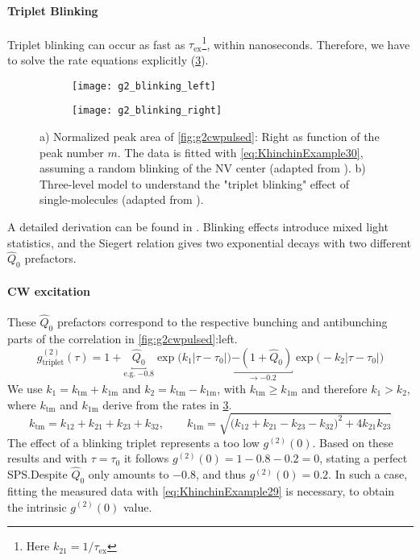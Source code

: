 \paragraph{Triplet Blinking}
Triplet blinking can occur as fast as $\tau_\mathrm{ex}$\footnote{Here $k_\mathrm{21}=1/\tau_\mathrm{ex}$}, within nanoseconds. Therefore, we have to solve the rate equations explicitly (\cref{fig:Blinking_b}). 
\begin{figure}[htp]
	\centering
	\begin{subfigure}{0.49\linewidth}
		\centering
		\texttt{[image: g2\_blinking\_left]}
		\caption{}
		\label{fig:Blinking_a}
	\end{subfigure}
	\hfill
	\begin{subfigure}{0.445\linewidth}
		\centering
		\texttt{[image: g2\_blinking\_right]}
		\caption{}
		\label{fig:Blinking_b}
	\end{subfigure}
	\caption{a) Normalized peak area of \cref{fig:g2cwpulsed}: Right as function of the peak number $m$. The data is fitted with \cref{eq:KhinchinExample30}, assuming a random blinking of the NV center (adapted from \cite{beveratos_room_2002}). b) Three-level model to understand the "triplet blinking" effect of single-molecules (adapted from \cite{tombesi_bunching_2002}).}
\end{figure}
\noindent A detailed derivation can be found in \cite{tombesi_bunching_2002}. Blinking effects introduce mixed light statistics, and the Siegert relation gives two exponential decays with two different $\hat{Q}_0$ prefactors.
\paragraph{CW excitation} These $\hat{Q}_0$ prefactors correspond to the respective bunching and antibunching parts of the correlation in \cref{fig:g2cwpulsed}:left.
\begin{equation}\label{eq:KhinchinExample29}
	g^{(2)}_\mathrm{triplet}(\tau) = 1 + \underbracket{\hat{Q}_0}_\mathrm{e.g.\;\num{-0.8}}\exp\Big(k_1|\tau-\tau_0|\Big)\underbracket{-(1+\hat{Q}_0)}_{\rightarrow \num{-0.2}}\exp\Big(-k_2|\tau-\tau_0|\Big)
\end{equation}
We use $k_1=k_\mathrm{tm}+k_\mathrm{1m}$ and $k_2=k_\mathrm{tm}-k_\mathrm{1m}$, with $k_\mathrm{tm}\geq k_\mathrm{1m}$ and therefore $k_1>k_2$, where $k_\mathrm{tm}$ and $k_\mathrm{1m}$ derive from the rates in \cref{fig:Blinking_b}.
\begin{equation}\label{eq:KhinchinExample210}
	k_\mathrm{tm}=k_\mathrm{12}+k_\mathrm{21}+k_\mathrm{23}+k_\mathrm{32},\qquad k_\mathrm{1m}=\sqrt{\Big(k_\mathrm{12}+k_\mathrm{21}-k_\mathrm{23}-k_\mathrm{32}\Big)^2+4k_\mathrm{21}k_\mathrm{23}}
\end{equation}
The effect of a blinking triplet represents a too low $g^{(2)}(0)$. Based on these results and with $\tau=\tau_0$ it follows $g^{(2)}(0)=1-0.8-0.2=0$, stating a perfect \ac{SPS}.Despite $\hat{Q}_0$ only amounts to \num{-0.8}, and thus $g^{(2)}(0)=0.2$. In such a case, fitting the measured data with \cref{eq:KhinchinExample29} is necessary, to obtain the intrinsic $g^{(2)}(0)$ value.

